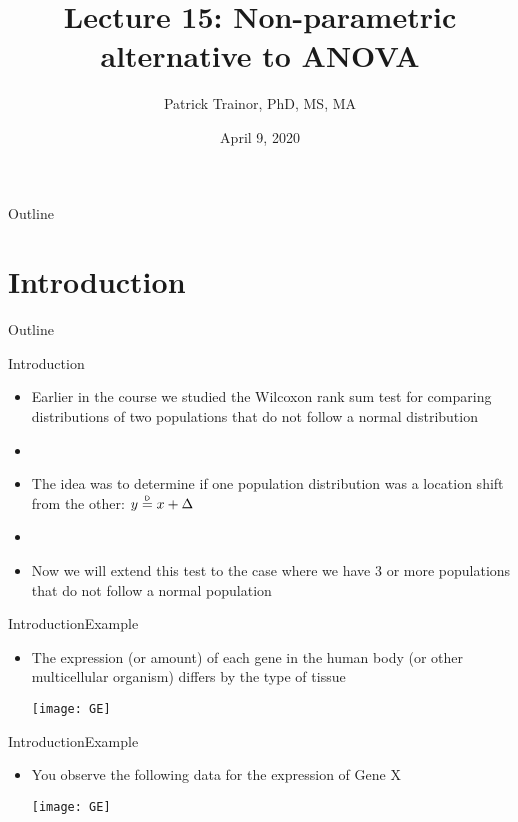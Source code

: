 \documentclass[xcolor=dvipsnames]{beamer}
\title[Lecture 15]{Lecture 15: Non-parametric alternative to ANOVA}
\author[Patrick Trainor]{Patrick Trainor, PhD, MS, MA}
\institute[NMSU]{New Mexico State University}
\date{April 9, 2020}
\newcommand\myeq{\mathrel{\overset{\makebox[0pt]{\mbox{\normalfont\tiny\sffamily D}}}{=}}}
\begin{document}
	
\begin{frame}
	\maketitle
\end{frame}

\begin{frame}{Outline}
	\tableofcontents[hideallsubsections]
\end{frame}

\section{Introduction}

\begin{frame}{Outline}
	\tableofcontents[currentsection,subsectionstyle=show/shaded/hide]
\end{frame}

\begin{frame}{Introduction}
	\begin{itemize}
		\item Earlier in the course we studied the Wilcoxon rank sum test for comparing distributions of two populations that do not follow a normal distribution \pause
		\item[]
		\item The idea was to determine if one population distribution was a location shift from the other: $y \myeq x + \Delta$ \pause
		\item[]
		\item Now we will extend this test to the case where we have 3 or more populations that do not follow a normal population
	\end{itemize}
\end{frame}

\begin{frame}{Introduction}{Example}
	\begin{itemize}
		\item The expression (or amount) of each gene in the human body (or other multicellular organism) differs by the type of tissue 
		\begin{center}
			\texttt{[image: GE]}
		\end{center}
	\end{itemize}
\end{frame}

\begin{frame}{Introduction}{Example}
	\begin{itemize}
		\item You observe the following data for the expression of Gene X
		\begin{center}
			\texttt{[image: GE]}
		\end{center}
	\end{itemize}
\end{frame}
\end{document}
